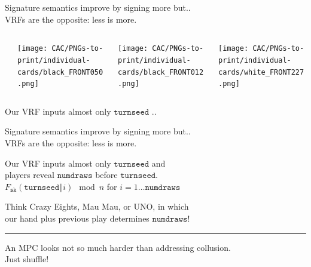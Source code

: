\documentclass[fleqn,xcolor={usenames,dvipsnames},notes,aspectratio=169]{beamer} %
\newcommand{\var}[1]{\ensuremath{\mathtt{#1}}}
\newcommand{\sk}{\var{sk}}
\newcommand{\turnseed}{\var{turnseed}}
\newcommand\concatvert{\mathbin\Vert}
\begin{document}
\begin{frame}

Signature semantics improve by signing more but.. \\ \smallskip
\hspace*{120pt}  VRFs are the opposite: less is more.

\bigskip\medskip

\begin{columns}
\begin{column}[t]{0.1\textwidth}
\end{column}
\begin{column}[t]{0.3\textwidth}
\texttt{[image: CAC/PNGs-to-print/individual-cards/black\_FRONT050.png]}
\end{column}
\begin{column}[t]{0.3\textwidth}
\texttt{[image: CAC/PNGs-to-print/individual-cards/black\_FRONT012.png]}
\end{column}
\begin{column}[t]{0.3\textwidth}
\texttt{[image: CAC/PNGs-to-print/individual-cards/white\_FRONT227.png]}
\end{column}
\end{columns}   

\bigskip\medskip

Our VRF inputs almost only $\turnseed$ ..

\end{frame}



\begin{frame}

Signature semantics improve by signing more but.. \\ \smallskip
\hspace*{120pt}  VRFs are the opposite: less is more.

\bigskip\medskip

Our VRF inputs almost only $\turnseed$ and \\
\hspace*{10pt} players reveal $\var{numdraws}$ before $\turnseed$. \\ \medskip 
 {\hfil $F_\sk(\turnseed \concatvert i) \mod n$ for $i=1 \ldots \var{numdraws}$ \hfil}

\bigskip

Think Crazy Eights, Mau Mau, or UNO, in which \\
\hspace*{20pt} our hand plus previous play determines $\var{numdraws}$!


\pause
\bigskip
\bigskip
\bigskip
\textcolor[RGB]{220,220,220}{\rule{\linewidth}{0.2pt}}

An MPC looks not so much harder than addressing collusion. \\
\hspace*{20pt} Just shuffle! 

\end{frame}
\end{document}
